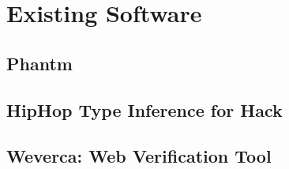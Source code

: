 \chapter{Existing Software}
    \section{Phantm\cite{kneuss2010using}}
    
    \section{HipHop Type Inference for Hack}
    
    \section{Weverca: Web Verification Tool\cite{hauzarhunting}}
